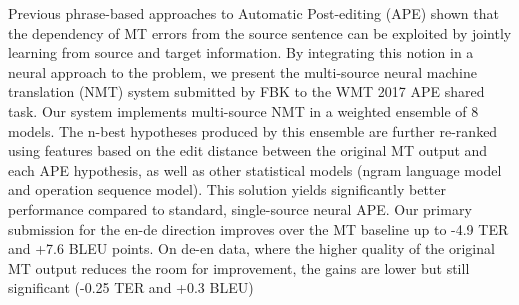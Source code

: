 Previous phrase-based approaches to Automatic Post-editing (APE) shown that the dependency of MT errors from the source sentence can be exploited by jointly learning from source and target information. By integrating this notion in a neural approach to the problem, we present the multi-source neural machine translation (NMT) system submitted by FBK to the WMT 2017 APE shared task. Our system implements multi-source NMT in a weighted ensemble of 8 models. The n-best hypotheses produced by this ensemble are further re-ranked using features based on the edit distance between the original MT output and each APE hypothesis, as well as other statistical models (ngram language model and operation sequence model). This solution yields significantly better performance compared to standard, single-source neural APE. Our primary submission for the en-de direction improves over the MT baseline up to -4.9 TER and +7.6 BLEU points. On de-en data, where the higher quality of the original MT output reduces the room for improvement, the gains are lower but still significant (-0.25 TER and +0.3 BLEU)
